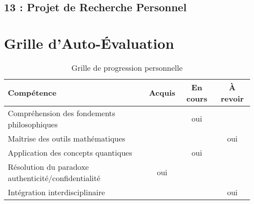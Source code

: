 \documentclass[12pt,a4paper]{article}
\begin{document}
	 \subsection*{ 13 : Projet de Recherche Personnel}
	 
	
	 
	 \section*{Grille d'Auto-Évaluation}
	  \begin{table}
	 	\begin{tabular}{|l|c|c|c|}
	 		\hline
	 		\textbf{Compétence} & \textbf{Acquis} & \textbf{En cours} & \textbf{À revoir} \\
	 		\hline
	 		Compréhension des fondements philosophiques & & oui & \\
	 		Maîtrise des outils mathématiques & &  & oui \\
	 		Application des concepts quantiques & & oui & \\
	 		Résolution du paradoxe authenticité/confidentialité & oui &  & \\
	 		Intégration interdisciplinaire &  & & oui  \\
	 		\hline
	 	\end{tabular}
	 	\caption{Grille de progression personnelle}
	 \end{table}
	 
	 
\end{document}
